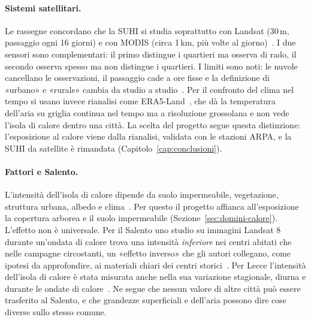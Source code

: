 \paragraph{Sistemi satellitari.} Le rassegne concordano che la SUHI si studia soprattutto con Landsat (30\,m, passaggio ogni 16 giorni) e con MODIS (circa 1\,km, più volte al giorno)~\cite{zhou2019,almeida2021}. I due sensori sono complementari: il primo distingue i quartieri ma osserva di rado, il secondo osserva spesso ma non distingue i quartieri. I limiti sono noti: le nuvole cancellano le osservazioni, il passaggio cade a ore fisse e la definizione di «urbano» e «rurale» cambia da studio a studio~\cite{zhou2019}. Per il confronto del clima nel tempo si usano invece rianalisi come ERA5-Land~\cite{era5_land}, che dà la temperatura dell'aria su griglia continua nel tempo ma a risoluzione grossolana e non vede l'isola di calore dentro una città. La scelta del progetto segue questa distinzione: l'esposizione al calore viene dalla rianalisi, validata con le stazioni ARPA, e la SUHI da satellite è rimandata (Capitolo~\ref{cap:conclusioni}).

\paragraph{Fattori e Salento.} L'intensità dell'isola di calore dipende da suolo impermeabile, vegetazione, struttura urbana, albedo e clima~\cite{zhou2019}. Per questo il progetto affianca all'esposizione la copertura arborea e il suolo impermeabile (Sezione~\ref{sec:domini-calore}). L'effetto non è universale. Per il Salento uno studio su immagini Landsat 8 durante un'ondata di calore trova una intensità \emph{inferiore} nei centri abitati che nelle campagne circostanti, un «effetto inverso» che gli autori collegano, come ipotesi da approfondire, ai materiali chiari dei centri storici~\cite{derazza2024}. Per Lecce l'intensità dell'isola di calore è stata misurata anche nella sua variazione stagionale, diurna e durante le ondate di calore~\cite{pappaccogli_uhi_lecce_2024}. Ne segue che nessun valore di altre città può essere trasferito al Salento, e che grandezze superficiali e dell'aria possono dire cose diverse sullo stesso comune.

